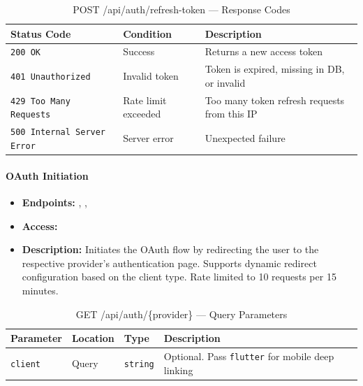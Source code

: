 \begin{table}[H]
\centering
\renewcommand{\arraystretch}{1.3}
\begin{tabularx}{\textwidth}{|l|l|X|}
\hline
\textbf{Status Code} & \textbf{Condition} & \textbf{Description} \\
\hline
\texttt{200 OK}           & Success              & Returns a new access token \\
\hline
\texttt{401 Unauthorized} & Invalid token        & Token is expired, missing in DB, or invalid \\
\hline
\texttt{429 Too Many Requests} & Rate limit exceeded & Too many token refresh requests from this IP \\
\hline
\texttt{500 Internal Server Error} & Server error & Unexpected failure \\
\hline
\end{tabularx}
\caption{POST /api/auth/refresh-token — Response Codes}
\label{tab:refresh-token-responses}
\end{table}
\FloatBarrier

\paragraph{OAuth Initiation}
\label{subsubsec:oauth-initiation}

\begin{itemize}
  \item \textbf{Endpoints:} 
  \texttt{}, 
  \texttt{}, 
  \texttt{}
  \item \textbf{Access:} \texttt{}
  \item \textbf{Description:} Initiates the OAuth flow by redirecting the user to the respective provider's authentication page. Supports dynamic redirect configuration based on the client type. Rate limited to 10 requests per 15 minutes.
\end{itemize}

\begin{table}[H]
\centering
\renewcommand{\arraystretch}{1.3}
\begin{tabularx}{\textwidth}{|l|l|l|X|}
\hline
\textbf{Parameter} & \textbf{Location} & \textbf{Type} & \textbf{Description} \\
\hline
\texttt{client}    & Query & \texttt{string} & Optional. Pass \texttt{flutter} for mobile deep linking \\
\hline
\end{tabularx}
\caption{GET /api/auth/\{provider\} — Query Parameters}
\label{tab:oauth-initiation-params}
\end{table}

